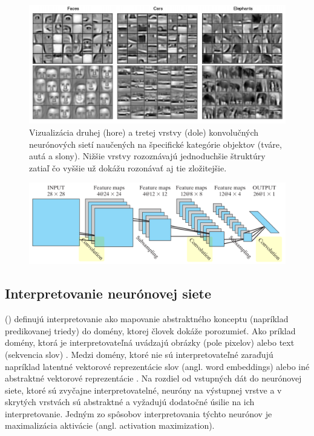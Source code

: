 \begin{figure}[h!]
    \centering
    \includegraphics[scale=0.5]{assets/images/cnn.png}
    \caption{
        Vizualizácia druhej (hore) a tretej vrstvy (dole) konvolučných neurónových sietí naučených na špecifické kategórie objektov (tváre, autá a slony). \cite{Lee_Grosse_Ranganath_Ng} Nižšie vrstvy rozoznávajú jednoduchšie štruktúry zatiaľ čo vyššie už dokážu rozonávať aj tie zložitejšie.
    }
    \label{fig:cnn}
\end{figure}


\begin{figure}[h!]
    \centering
    \includegraphics[width=12cm]{assets/images/conv_net_architecture.png}
    \caption{}
    \label{fig:conv_net_architecture}
\end{figure}

\subsection{Interpretovanie neurónovej siete}

\citeauthor{montavon2018methods} (\citeyear{montavon2018methods}) definujú interpretovanie ako mapovanie abstraktného konceptu (napríklad predikovanej triedy) do domény, ktorej človek dokáže porozumieť. Ako príklad domény, ktorá je interpretovateľná uvádzajú obrázky (pole pixelov) alebo text (sekvencia slov) \cite{montavon2018methods}. Medzi domény, ktoré nie sú interpretovateľné zaraďujú napríklad latentné vektorové reprezentácie slov (angl. word embeddings) alebo iné abstraktné vektorové reprezentácie \cite{montavon2018methods}.
Na rozdiel od vstupných dát do neurónovej siete, ktoré sú zvyčajne interpretovatelné, neuróny na výstupnej vrstve a v skrytých vrstvách sú abstraktné a vyžadujú dodatočné úsilie na ich interpretovanie. Jedným zo spôsobov interpretovania týchto neurónov je maximalizácia aktivácie (angl. activation maximization).

